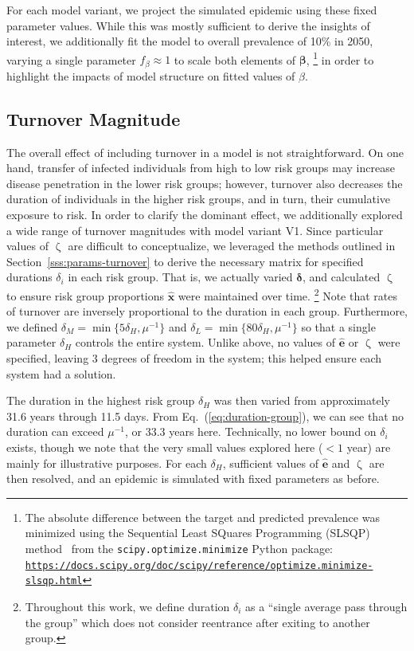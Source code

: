 \documentclass[10pt]{article}
\numberwithin{equation}{section}
\renewcommand{\zeta}{\upzeta}
\newcommand{\hreftt}[1]{\href{#1}{\texttt{#1}}}
\newcommand{\eq}[1]{Eq.~(\ref{#1})}
\begin{document}
\par
For each model variant,
we project the simulated epidemic using these fixed parameter values.
While this was mostly sufficient to derive the insights of interest,
we additionally fit the model to overall prevalence of 10\% in 2050,
varying a single parameter $f_{\beta} \approx 1$ to scale both elements of $\bm{\beta}$,%
\footnote{The absolute difference between the target and predicted prevalence
  was minimized using
  the Sequential Least SQuares Programming (SLSQP) method~\cite{Kraft1988} from
  the \texttt{scipy.optimize.minimize} Python package:\\
  \hreftt{https://docs.scipy.org/doc/scipy/reference/optimize.minimize-slsqp.html}}
in order to highlight the impacts of model structure on fitted values of $\beta$.
\subsection{Turnover Magnitude}\label{ss:exp-zeta-mag}
The overall effect of including turnover in a model is not straightforward.
On one hand, transfer of infected individuals from high to low risk groups may
increase disease penetration in the lower risk groups;
however, turnover also decreases the duration of individuals in the higher risk groups,
and in turn, their cumulative exposure to risk.
In order to clarify the dominant effect,
we additionally explored a wide range of turnover magnitudes
with model variant V1.
Since particular values of $\zeta$ are difficult to conceptualize,
we leveraged the methods outlined in Section~\ref{sss:params-turnover}
to derive the necessary matrix for specified durations $\delta_i$ in each risk group.
That is, we actually varied $\bm{\delta}$,
and calculated $\zeta$ to ensure risk group proportions $\bm{\hat{x}}$ were maintained over time.%
\footnote{Throughout this work,
  we define duration $\delta_i$ as a ``single average pass through the group''
  which does not consider reentrance after exiting to another group.}
Note that rates of turnover are inversely proportional to the duration in each group.
Furthermore, we defined
$\delta_M = \min{\{ 5\delta_H,\mu^{-1}\}}$ and
$\delta_L = \min{\{80\delta_H,\mu^{-1}\}}$
so that a single parameter $\delta_H$ controls the entire system.
Unlike above, no values of $\bm{\hat{e}}$ or $\zeta$ were specified,
leaving 3 degrees of freedom in the system;
this helped ensure each system had a solution.
\par
The duration in the highest risk group $\delta_H$ was then varied
from approximately 31.6 years through 11.5 days.
From \eq{eq:duration-group}, we can see that no duration can exceed $\mu^{-1}$,
or 33.3 years here.
Technically, no lower bound on $\delta_i$ exists,
though we note that the very small values explored here ($< 1$ year)
are mainly for illustrative purposes.
For each $\delta_H$, sufficient values of $\bm{\hat{e}}$ and $\zeta$ are then resolved,
and an epidemic is simulated with fixed parameters as before.
\end{document}
